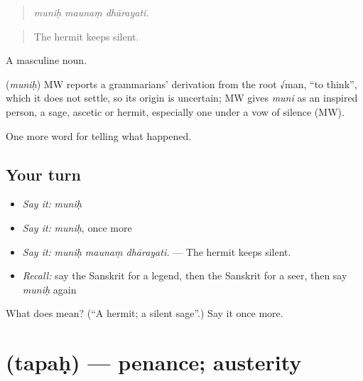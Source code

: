 \begin{quote}
  
\end{quote}

\begin{quote}
\emph{muniḥ maunaṃ dhārayati.}
\end{quote}

\begin{quote}
The hermit keeps silent.
\end{quote}

A masculine noun.

\begin{cousinweb}
\textbf{} (\emph{muniḥ}) MW reports a grammarians' derivation from the root √man, \textquotedblleft{}to think\textquotedblright{}, which it does not settle, so its origin is uncertain; MW gives \emph{muni} as an inspired person, a sage, ascetic or hermit, especially one under a vow of silence (MW).
\end{cousinweb}

\begin{grammarlens}[title={What you've built}]
One more word for telling what happened.
\end{grammarlens}

\subsection*{Your turn}
\begin{itemize}
\raggedright
  \item \emph{Say it:} \emph{muniḥ}
  \item \emph{Say it:} \emph{muniḥ}, once more
  \item \emph{Say it:} \emph{muniḥ maunaṃ dhārayati.} — The hermit keeps silent.
  \item \emph{Recall:} say the Sanskrit for a legend, then the Sanskrit for a seer, then say \emph{muniḥ} again
\end{itemize}

\begin{tcolorbox}[breakable,colback=teal!4,colframe=teal!35!black,title={Before you move on}]
What does  mean? (\textquotedblleft{}A hermit; a silent sage\textquotedblright{}.) Say it once more.
\end{tcolorbox}
\section[\texorpdfstring{\sk{तपः} (tapaḥ)}{तपः (tapaḥ)}]{ (tapaḥ) — penance; austerity}

